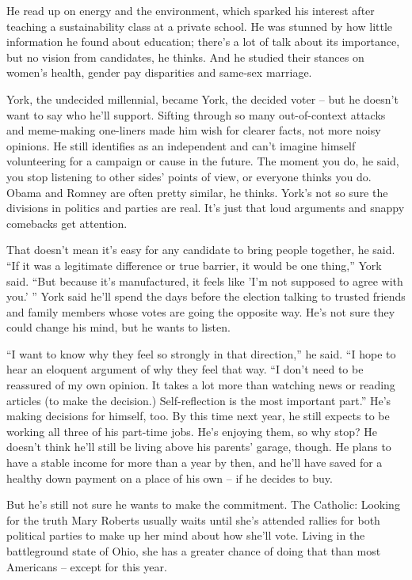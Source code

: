\documentclass[%
        TwoSidePages,%
        Portuguese,%
        FinalVersion,%
        TablesPage,%
        FiguresPage,%
        ]%
{ic-tese-v2}
\begin{document}
He read up on energy and the environment, which sparked his interest after teaching a sustainability class at a private school. He was stunned by how little information he found about education; there's a lot of talk about its importance, but no vision from candidates, he thinks. And he studied their stances on women's health, gender pay disparities and same-sex marriage.

York, the undecided millennial, became York, the decided voter -- but he doesn't want to say who he'll support. Sifting through so many out-of-context attacks and meme-making one-liners made him wish for clearer facts, not more noisy opinions.
He still identifies as an independent and can't imagine himself volunteering for a campaign or cause in the future. The moment you do, he said, you stop listening to other sides' points of view, or everyone thinks you do. Obama and Romney are often pretty similar, he thinks. York's not so sure the divisions in politics and parties are real. It's just that loud arguments and snappy comebacks get attention.

That doesn't mean it's easy for any candidate to bring people together, he said.
``If it was a legitimate difference or true barrier, it would be one thing,'' York said. ``But because it's manufactured, it feels like 'I'm not supposed to agree with you.' ''
York said he'll spend the days before the election talking to trusted friends and family members whose votes are going the opposite way. He's not sure they could change his mind, but he wants to listen.

``I want to know why they feel so strongly in that direction,'' he said. ``I hope to hear an eloquent argument of why they feel that way.
``I don't need to be reassured of my own opinion. It takes a lot more than watching news or reading articles (to make the decision.) Self-reflection is the most important part.''
He's making decisions for himself, too. By this time next year, he still expects to be working all three of his part-time jobs. He's enjoying them, so why stop? He doesn't think he'll still be living above his parents' garage, though. He plans to have a stable income for more than a year by then, and he'll have saved for a healthy down payment on a place of his own -- if he decides to buy.

But he's still not sure he wants to make the commitment.
The Catholic: Looking for the truth
Mary Roberts usually waits until she's attended rallies for both political parties to make up her mind about how she'll vote. Living in the battleground state of Ohio, she has a greater chance of doing that than most Americans -- except for this year.
\end{document}
